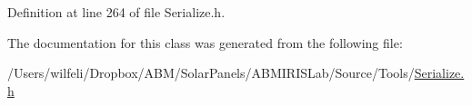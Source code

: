 Definition at line 264 of file Serialize.\+h.



The documentation for this class was generated from the following file\+:\begin{DoxyCompactItemize}
\item 
/\+Users/wilfeli/\+Dropbox/\+A\+B\+M/\+Solar\+Panels/\+A\+B\+M\+I\+R\+I\+S\+Lab/\+Source/\+Tools/\hyperlink{_serialize_8h}{Serialize.\+h}\end{DoxyCompactItemize}
